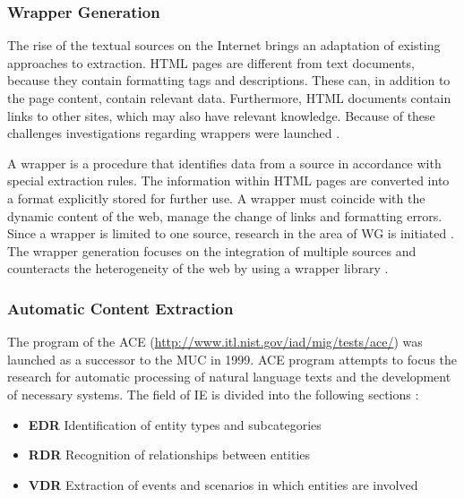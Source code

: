 \subsubsection{Wrapper Generation}
The rise of the textual sources on the Internet brings an adaptation of existing approaches to extraction. HTML pages are different from text documents, because they contain formatting tags and descriptions. These can, in addition to the page content, contain relevant data. Furthermore, HTML documents contain links to other sites, which may also have relevant knowledge. Because of these challenges investigations regarding wrappers were launched  \cite{Eikvil:1999}\cite{Freitag:2000}\cite{Linsmayr:2010}.

A wrapper is a procedure that identifies data from a source in accordance with special extraction rules. The information within HTML pages are converted into a format explicitly stored for further use. A wrapper must coincide with the dynamic content of the web, manage the change of links and formatting errors. Since a wrapper is limited to one source, research in the area of \gls{WG} is initiated \cite{Chang:2006}\cite{Eikvil:1999}. The wrapper generation focuses on the integration of multiple sources and counteracts the heterogeneity of the web by using a wrapper library \cite{Siefkes:2007}\cite{Turmo:2006}.

\subsubsection{Automatic Content Extraction}
The program of the \gls{ACE} (\url{http://www.itl.nist.gov/iad/mig/tests/ace/})  was launched as a successor to the \gls{MUC} in 1999. \gls{ACE} program attempts to focus the research for automatic processing of natural language texts and the development of necessary systems. The field of \gls{IE} is divided into the following sections \cite{Nist:2008}\cite{Lavelli:2008}\cite{Turmo:2006}\cite{Linsmayr:2010}:

\begin{itemize}
\item \textbf{\gls{EDR}} \newline
Identification of entity types and subcategories
\item \textbf{\gls{RDR}} \newline
Recognition of relationships between entities
\item \textbf{\gls{VDR}} \newline
Extraction of events and scenarios in which entities are involved
\end{itemize}

